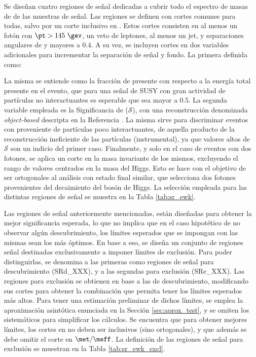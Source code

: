Se diseñan cuatro regiones de señal dedicadas a cubrir todo el espectro de masas de \ninoone de las muestras de señal. Las regiones se definen con cortes comunes para todas, salvo por un corte inclusivo en \met. Estos cortes consisten en al menos un fotón con $\pt>145\ \gev$, un veto de leptones, al menos un jet, y separaciones angulares de \dphijetmet y \dphigammet mayores a $0.4$. A su vez, se incluyen cortes en dos variables adicionales para incrementar la separación de señal y fondo. La primera definida como:


La misma se entiende como la fracción de \met presente con respecto a la energía total presente en el evento, que para una señal de SUSY con gran actividad de partículas no interactuantes es esperable que sea mayor a $0.5$.
La segunda variable empleada es la Significancia de \met ($\mathcal{S}$), con una reconstrucción denominada \textit{object-based} descripta en la Referencia \cite{ATLAS-CONF-2018-038}. La misma sirve para discriminar eventos con \met proveniente de partículas poco interactuantes, de aquella producto de la reconstrucción ineficiente de las partículas (instrumental), ya que valores altos de $\mathcal{S}$ son un indicio del primer caso. Finalmente, y solo en el caso de eventos con dos fotones, se aplica un corte en la masa invariante de los mismos, excluyendo el rango de valores centrados en la masa del Higgs. Esto se hace con el objetivo de ser ortogonales al análisis con estado final similar, que selecciona dos fotones provenientes del decaimiento del bosón de Higgs. La selección empleada para las distintas regiones de señal se muestra en la Tabla \ref{tab:sr_ewk}.




Las regiones de señal anteriormente mencionadas, están diseñadas para obtener la mejor significancia esperada, lo que no implica que en el caso hipotético de no observar algún descubrimiento, los límites esperados que se impongan con las mismas sean los más óptimos. 
En base a eso, se diseña un conjunto de regiones señal destinadas exclusivamente a imponer límites de exclusión. Para poder distinguirlas, se denomina a las primeras como regiones de señal para descubrimiento (SRd\_XXX), y a las segundas para exclusión (SRe\_XXX). Las regiones para exclusión se obtienen en base a las de descubrimiento, modificando sus cortes para obtener la combinación que permita tener los límites esperados más altos. Para tener una estimación preliminar de dichos límites, se emplea la aproximación asintótica enunciada en la Sección \ref{sec:aprox_test}, y se omiten los sistemáticos para simplificar los cálculos. Se encuentra que para obtener mejores límites, los cortes en \met no deben ser inclusivos (sino ortogonales), y que además se debe omitir el corte en $\met/\meff$. La definición de las regiones de señal para exclusión se muestran en la Tabla \ref{tab:sr_ewk_excl}.


